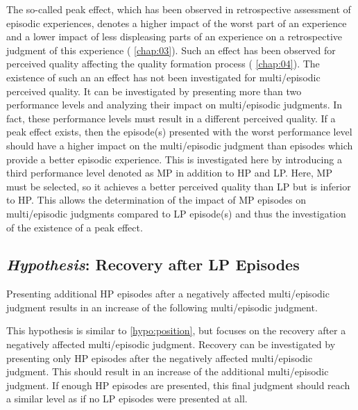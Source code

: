 The so-called peak effect, which has been observed in retrospective assessment of episodic experiences, denotes a higher impact of the worst part of an experience and a lower impact of less displeasing parts of an experience on a retrospective judgment of this experience (\cf{} \autoref{chap:03}).
Such an effect has been observed for perceived quality affecting the quality formation process (\cf{} \autoref{chap:04}).
The existence of such an an effect has not been investigated for multi\-/episodic perceived quality.
It can be investigated by presenting more than two performance levels and analyzing their impact on multi\-/episodic judgments.
In fact, these performance levels must result in a different perceived quality.
If a peak effect exists, then the episode(s) presented with the worst performance level should have a higher impact on the multi\-/episodic judgment than episodes which provide a better episodic experience.
This is investigated here by introducing a third performance level denoted as \ac{MP} in addition to \ac{HP} and \ac{LP}.
Here, \ac{MP} must be selected, so it achieves a better perceived quality than \ac{LP} but is inferior to \ac{HP}.
This allows the determination of the impact of \ac{MP} episodes on multi\-/episodic judgments compared to \ac{LP} episode(s) and thus the investigation of the existence of a peak effect.



\subsection[H5: Recovery after \acs{LP} Episodes]{\emph{Hypothesis}: Recovery after \acs{LP} Episodes}
\begin{hypothesis}\label{hypo:recovery}
Presenting additional \ac{HP} episodes after a negatively affected multi\-/episodic judgment results in an increase of the following multi\-/episodic judgment.
\end{hypothesis}

This hypothesis is similar to \autoref{hypo:position}, but focuses on the recovery after a negatively affected multi\-/episodic judgment.
Recovery can be investigated by presenting only \ac{HP} episodes after the negatively affected multi\-/episodic judgment.
This should result in an increase of the additional multi\-/episodic judgment.
If enough \ac{HP} episodes are presented, this final judgment should reach a similar level as if no \ac{LP} episodes were presented at all.

